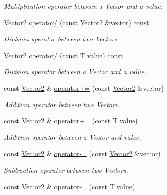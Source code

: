 \begin{DoxyCompactItemize}
\begin{DoxyCompactList}\small\item\em Multiplication operator between a Vector and a value. \end{DoxyCompactList}\item 
\hyperlink{classsparky_1_1_vector2}{Vector2} \hyperlink{classsparky_1_1_vector2_a10c66d9ba7d64bc64ac5243ce23c20db}{operator/} (const \hyperlink{classsparky_1_1_vector2}{Vector2} \&vector) const 
\begin{DoxyCompactList}\small\item\em Division operator between two Vectors. \end{DoxyCompactList}\item 
\hyperlink{classsparky_1_1_vector2}{Vector2} \hyperlink{classsparky_1_1_vector2_ab1a4d2950cb691643487dd86a41ab392}{operator/} (const T value) const 
\begin{DoxyCompactList}\small\item\em Division operator between a Vector and a value. \end{DoxyCompactList}\item 
const \hyperlink{classsparky_1_1_vector2}{Vector2} \& \hyperlink{classsparky_1_1_vector2_a3b7e4256f56c387e53c801c485ec15fd}{operator+=} (const \hyperlink{classsparky_1_1_vector2}{Vector2} \&vector)
\begin{DoxyCompactList}\small\item\em Addition operator between two Vectors. \end{DoxyCompactList}\item 
const \hyperlink{classsparky_1_1_vector2}{Vector2} \& \hyperlink{classsparky_1_1_vector2_ac614212b964b4d2d79442501b7e0c79e}{operator+=} (const T value)
\begin{DoxyCompactList}\small\item\em Addition operator between a Vector and value. \end{DoxyCompactList}\item 
const \hyperlink{classsparky_1_1_vector2}{Vector2} \& \hyperlink{classsparky_1_1_vector2_a89bef442fe29ac65a67e04ae3bba030a}{operator-\/=} (const \hyperlink{classsparky_1_1_vector2}{Vector2} \&vector)
\begin{DoxyCompactList}\small\item\em Subtraction operator between two Vectors. \end{DoxyCompactList}\item 
const \hyperlink{classsparky_1_1_vector2}{Vector2} \& \hyperlink{classsparky_1_1_vector2_ae5eb6cdc0c4e1c95a519e0b003432beb}{operator-\/=} (const T value)

\end{DoxyCompactItemize}
